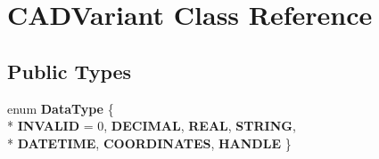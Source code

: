 \hypertarget{class_c_a_d_variant}{}\section{C\+A\+D\+Variant Class Reference}
\label{class_c_a_d_variant}
\subsection*{Public Types}
\begin{DoxyCompactItemize}
\item 
enum {\bfseries Data\+Type} \{ \\*
{\bfseries I\+N\+V\+A\+L\+ID} = 0, 
{\bfseries D\+E\+C\+I\+M\+AL}, 
{\bfseries R\+E\+AL}, 
{\bfseries S\+T\+R\+I\+NG}, 
\\*
{\bfseries D\+A\+T\+E\+T\+I\+ME}, 
{\bfseries C\+O\+O\+R\+D\+I\+N\+A\+T\+ES}, 
{\bfseries H\+A\+N\+D\+LE}
 \}\hypertarget{class_c_a_d_variant_aa4669662c406fee57bbf5fbf5d261e6b}{}\label{class_c_a_d_variant_aa4669662c406fee57bbf5fbf5d261e6b}

\end{DoxyCompactItemize}
